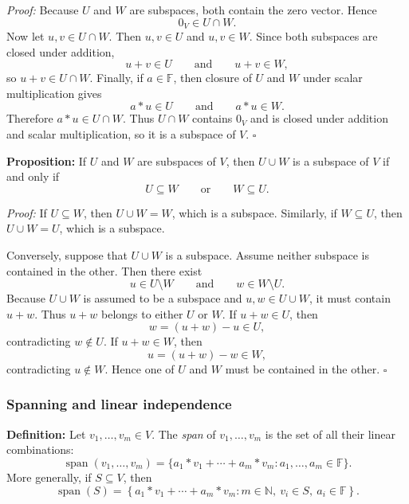 \documentclass[a4paper,11pt,abstract=true]{scrartcl}
\theoremstyle{dotlessP}
\theoremstyle{dotlessS}
\theoremstyle{remark}
\theoremstyle{definition}
\begin{document}
\begin{claim_box}
\textit{Proof:} Because $U$ and $W$ are subspaces, both contain the zero
vector. Hence
\[
0_V\in U\cap W.
\]
Now let $u,v\in U\cap W$. Then $u,v\in U$ and $u,v\in W$. Since both
subspaces are closed under addition,
\[
u+v\in U
\qquad\text{and}\qquad
u+v\in W,
\]
so $u+v\in U\cap W$. Finally, if $a\in \mathbb{F}$, then closure of $U$ and $W$ under
scalar multiplication gives
\[
a*u\in U
\qquad\text{and}\qquad
a*u\in W.
\]
Therefore $a*u\in U\cap W$. Thus $U\cap W$ contains $0_V$ and is closed
under addition and scalar multiplication, so it is a subspace of $V$.
\hfill$\square$
\end{claim_box}

\begin{problem_box}
\textbf{Proposition:} If $U$ and $W$ are subspaces
of $V$, then $U\cup W$ is a subspace of $V$ if and only if
\[
U\subseteq W
\qquad\text{or}\qquad
W\subseteq U.
\]

\end{problem_box}

\begin{claim_box}
\textit{Proof:} If $U\subseteq W$, then $U\cup W=W$, which is a subspace.
Similarly, if $W\subseteq U$, then $U\cup W=U$, which is a subspace.

Conversely, suppose that $U\cup W$ is a subspace. Assume neither subspace is
contained in the other. Then there exist
\[
u\in U\setminus W
\qquad\text{and}\qquad
w\in W\setminus U.
\]
Because $U\cup W$ is assumed to be a subspace and $u,w\in U\cup W$, it must
contain $u+w$. Thus $u+w$ belongs to either $U$ or $W$. If $u+w\in U$, then
\[
w=(u+w)-u\in U,
\]
contradicting $w\notin U$. If $u+w\in W$, then
\[
u=(u+w)-w\in W,
\]
contradicting $u\notin W$. Hence one of $U$ and $W$ must be contained in the
other. \hfill$\square$
\end{claim_box}

\subsubsection{Spanning and linear independence}
\begin{definition_box}
\textbf{Definition:} Let $v_1,\ldots,v_m\in V$. The \emph{span} of
$v_1,\ldots,v_m$ is the set of all their linear combinations:
\[
\operatorname{span}(v_1,\ldots,v_m)
=\{a_1*v_1+\cdots+a_m*v_m:a_1,\ldots,a_m\in \mathbb{F}\}.
\]
More generally, if $S\subseteq V$, then
\[
\operatorname{span}(S)
=\left\{a_1*v_1+\cdots+a_m*v_m:
m\in\mathbb{N},\ v_i\in S,\ a_i\in \mathbb{F}\right\}.
\]
\end{definition_box}
\end{document}
